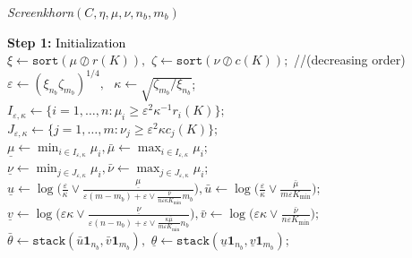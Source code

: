 \LinesNotNumbered
\begin{algorithm}[htbp]
\DontPrintSemicolon
\caption{\emph{Screenkhorn}$(C,\eta,\mu,\nu,n_b,m_b)$}
\label{screenkhorn}

\textbf{Step 1:} \textcolor{black}{Initialization}\\

\nl   $\xi \gets \texttt{sort}(\mu \oslash r(K)),$ $\zeta \gets \texttt{sort}(\nu \oslash c(K));$ //(decreasing order)\\
\nl   $\varepsilon \gets (\xi_{n_b}\zeta_{m_b})^{1/4}, \text{  } \kappa \gets \sqrt{{\zeta_{m_b}}/{\xi_{n_b}}}$;\\
\nl   $I_{\varepsilon,\kappa} \gets \{i=1, \ldots, n: \mu_i \geq {\varepsilon^2} \kappa^{-1} r_i(K)\};$\\
\nl   $J_{\varepsilon,\kappa} \gets \{j=1, \ldots, m: \nu_j \geq \varepsilon^2\kappa c_j(K)\};$\\ 
\nl   $\underline{\mu} \gets \min_{i \in I_{\varepsilon,\kappa}} \mu_i, \bar{\mu} \gets \max_{i \in I_{\varepsilon,\kappa}} \mu_i$; \\
\nl   $\underline{\nu} \gets \min_{j \in J_{\varepsilon,\kappa}} \mu_i, \bar{\nu} \gets \max_{j \in J_{\varepsilon,\kappa}} \mu_i$; \\
\nl   $\underline{u} \gets \log\big(\frac \varepsilon\kappa \vee \frac{\underline{\mu}}{\varepsilon (m-m_b) + \varepsilon \vee \frac{\bar{\nu}}{n\varepsilon\kappa K_{\min}} m_b}\big), \bar{u} \gets  \log\big(\frac \varepsilon\kappa\vee \frac{\bar{\mu}}{m\varepsilon K_{\min}}\big);$\\
\nl   $\underline{v} \gets \log\big(\varepsilon\kappa \vee \frac{\underline{\nu}}{\varepsilon(n-n_b) + \varepsilon \vee \frac{\kappa\bar{\mu}}{m\varepsilon K_{\min}} n_b}\big), \bar{v} \gets \log\big(\varepsilon\kappa \vee \frac{\bar{\nu}}{n\varepsilon K_{\min}}\big);$\\
\nl   $ \bar{\theta} \gets \texttt{stack}(\bar{u}\mathbf 1_{n_b}, \bar{v}\mathbf 1_{m_b}),$ $ \underline{\theta} \gets \texttt{stack}(\underline{u}\mathbf 1_{n_b}, \underline{v}\mathbf 1_{m_b}) ;$\\


\end{algorithm}
